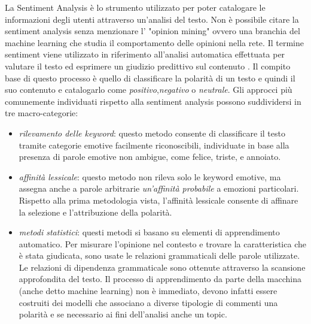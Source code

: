 La Sentiment Analysis è lo strumento utilizzato per poter catalogare le informazioni degli utenti attraverso un'analisi del testo. Non è possibile citare la sentiment analysis senza menzionare l' "opinion mining" ovvero una branchia del machine learning che studia il comportamento delle opinioni nella rete.
Il termine sentiment viene utilizzato in riferimento all'analisi automatica effettuata per valutare il testo ed esprimere un giudizio predittivo sul contenuto \cite{pang2015sentiment}.
Il compito base di questo processo è quello di classificare la polarità di un testo e quindi il suo contenuto e catalogarlo come \textit{positivo},\textit{negativo} o \textit{neutrale}.
Gli approcci più comunemente individuati rispetto alla sentiment analysis possono suddividersi in tre macro-categorie: 
\begin{itemize}
\item \textit{rilevamento delle keyword}: questo metodo consente di classificare il testo tramite categorie emotive facilmente riconoscibili, individuate in base alla presenza di parole emotive non ambigue, come felice, triste, e annoiato.
\item \textit{affinità lessicale}: questo metodo non rileva solo le keyword emotive, ma assegna anche a parole arbitrarie \textit{un'affinità probabile} a emozioni particolari. Rispetto alla prima metodologia vista, l'affinità lessicale consente di affinare la selezione e l'attribuzione della polarità.
\item \textit{metodi statistici}: questi metodi si basano su elementi di apprendimento automatico. Per misurare l'opinione nel contesto e trovare la caratteristica che è stata giudicata, sono usate le relazioni grammaticali delle parole utilizzate. Le relazioni di dipendenza grammaticale sono ottenute attraverso la scansione approfondita del testo. Il processo di apprendimento da parte della macchina (anche detto machine learning) non è immediato, devono infatti essere costruiti dei modelli che associano a diverse tipologie di commenti una polarità e se necessario ai fini dell'analisi anche un topic.
\end{itemize}

